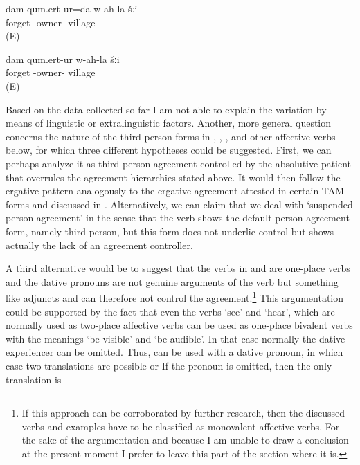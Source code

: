 \begin{exe}
	\ex	\label{ex:I (masc.) forgot my own village.A}
	\gll	dam qum.ert-ur=da w-ah-la šːi\\
	 	forget -owner- village\\
	\glt	{} (E)

	\ex	\label{ex:I (masc.) forgot my own village.B}
	\gll	dam qum.ert-ur w-ah-la šːi\\
		 	forget -owner- village\\
	\glt	{} (E)
\end{exe}

Based on the data collected so far I am not able to explain the variation by means of linguistic or extralinguistic factors. Another, more general question concerns the nature of the third person forms in , , , and other affective verbs below, for which three different hypotheses could be suggested. First, we can perhaps analyze it as third person agreement controlled by the absolutive patient that overrules the agreement hierarchies stated above. It would then follow the ergative pattern analogously to the ergative agreement attested in certain TAM forms and discussed in . Alternatively, we can claim that we deal with `suspended person agreement' in the sense that the verb shows the default person agreement form, namely third person, but this form does not underlie control but shows actually the lack of an agreement controller. 

A third alternative would be to suggest that the verbs in  and  are one-place verbs and the dative pronouns are not genuine arguments of the verb but something like adjuncts and can therefore not control the agreement.\footnote{If this approach can be corroborated by further research, then the discussed verbs and examples have to be classified as monovalent affective verbs. For the sake of the argumentation and because I am unable to draw a conclusion at the present moment I prefer to leave this part of the section where it is.} This argumentation could be supported by the fact that even the verbs `see' and `hear', which are normally used as two-place affective verbs can be used as one-place bivalent verbs with the meanings `be visible' and `be audible'. In that case normally the dative experiencer can be omitted. Thus,  can be used with a dative pronoun, in which case two translations are possible  or  If the pronoun is omitted, then the only translation is 

